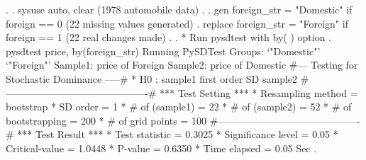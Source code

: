 . 
. sysuse auto, clear
(1978 automobile data)
{\smallskip}
. 
. gen     foreign_str = "Domestic" if foreign == 0
(22 missing values generated)
{\smallskip}
. replace foreign_str = "Foreign"  if foreign == 1
(22 real changes made)
{\smallskip}
. 
. * Run pysdtest with by( ) option
. pysdtest price, by(foreign_str)
Running PySDTest
Groups:
`"Domestic"' `"Foreign"'
Sample1: price of Foreign
Sample2: price of Domestic
{\smallskip}
\#--- Testing for Stochastic Dominance  -----\#
{\smallskip}
* H0 : sample1 first order SD sample2
{\smallskip}
\#-------------------------------------------\#
{\smallskip}
*** Test Setting ***
* Resampling method      = bootstrap
* SD order               =      1
* \# of (sample1)         =     22 
* \# of (sample2)         =     52
* \# of bootstrapping     =    200
* \# of grid points       =    100
{\smallskip}
\#-------------------------------------------\#
{\smallskip}
*** Test Result ***
* Test statistic         = 0.3025
* Significance level     =  0.05
* Critical-value         = 1.0448
* P-value                = 0.6350
* Time elapsed           =  0.05 Sec
{\smallskip}
. 
